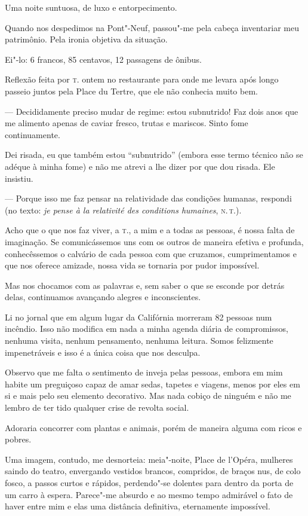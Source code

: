 Uma noite suntuosa, de luxo e entorpecimento.

Quando nos despedimos na Pont"-Neuf, passou"-me pela cabeça inventariar
meu patrimônio. Pela ironia objetiva da situação.

Ei"-lo: 6 francos, 85 centavos, 12 passagens de ônibus.

\asterisc

Reflexão feita por \textsc{t.} ontem no restaurante para onde me levara após
longo passeio juntos pela Place du Tertre, que ele não conhecia muito
bem.

--- Decididamente preciso mudar de regime: estou subnutrido! Faz dois anos que me alimento apenas de caviar fresco, trutas e mariscos. Sinto fome continuamente.

Dei risada, eu que também estou ``subnutrido'' (embora esse termo
técnico não se adéque à minha fome) e não me atrevi a lhe dizer por que
dou risada. Ele insistiu.

--- Porque isso me faz pensar na relatividade das condições humanas, respondi (no texto: \textit{je pense à la relativité des conditions humaines}, \textsc{n.\,t.}).

\asterisc

Acho que o que nos faz viver, a \textsc{t.}, a mim e a todas as pessoas, é
nossa falta de imaginação. Se comunicássemos uns com os outros de
maneira efetiva e profunda, conhecêssemos o calvário de cada pessoa
com que cruzamos, cumprimentamos e que nos oferece amizade, nossa
vida se tornaria por pudor impossível.

Mas nos chocamos com as palavras e, sem saber o que se esconde por
detrás delas, continuamos avançando alegres e inconscientes.

Li no jornal que em algum lugar da Califórnia morreram 82 pessoas num
incêndio. Isso não modifica em nada a minha agenda diária de
compromissos, nenhuma visita, nenhum pensamento, nenhuma leitura. Somos
felizmente impenetráveis e isso é a única coisa que nos desculpa.

\asterisc

Observo que me falta o sentimento de inveja pelas pessoas, embora em mim
habite um preguiçoso capaz de amar sedas, tapetes e viagens, menos por
eles em si e mais pelo seu elemento decorativo. Mas nada cobiço de
ninguém e não me lembro de ter tido qualquer crise de revolta social.

Adoraria concorrer com plantas e animais, porém de maneira alguma com
ricos e pobres.

Uma imagem, contudo, me desnorteia: meia"-noite, Place de l'Opéra,
mulheres saindo do teatro, envergando vestidos brancos, compridos, de
braços nus, de colo fosco, a passos curtos e rápidos, perdendo"-se
dolentes para dentro da porta de um carro à espera. Parece"-me absurdo e
ao mesmo tempo admirável o fato de haver entre mim e elas uma
distância definitiva, eternamente impossível.

